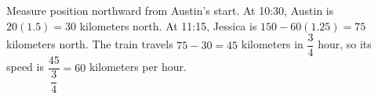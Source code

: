 Measure position northward from Austin's start. At 10:30, Austin is $20(1.5)=30$ kilometers north. At 11:15, Jessica is $150-60(1.25)=75$ kilometers north. The train travels $75-30=45$ kilometers in $\dfrac{3}{4}$ hour, so its speed is $\dfrac{45}{\dfrac{3}{4}}=\boxed{60}$ kilometers per hour.
